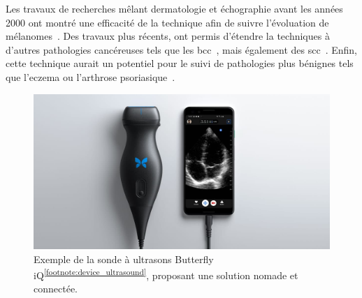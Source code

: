 Les travaux de recherches mêlant dermatologie et échographie avant les années 2000 ont montré une efficacité de la technique afin de suivre l'évoluation de mélanomes~\cite{Cammarota1998}. Des travaux plus récents, ont permis d'étendre la techniques à d'autres pathologies cancéreuses tels que les \gls{bcc}~\cite{Barcaui2014}, mais également des \gls{scc}~\cite{Catalano2010}. Enfin, cette technique aurait un potentiel pour le suivi de pathologies plus bénignes tels que l'eczema ou l'arthrose psoriasique~\cite{Bhatta2018}.\par

\begin{figure}[H]
    \centering
    \includegraphics[width=\linewidth]{contents/chapter_2/resources/exemple_ultrasound.jpg}
    \caption{Exemple de la sonde à ultrasons Butterfly iQ\textsuperscript{\ref{footnote:device_ultrasound}}, proposant une solution nomade et connectée.}
    \label{fig:exemple_ultrasound}
\end{figure}\par


\addtocounter{footnote}{1}
